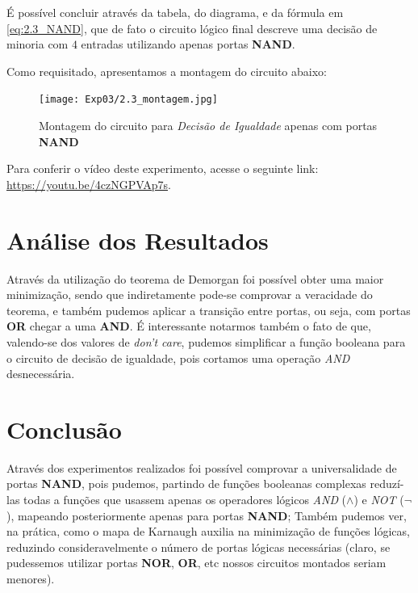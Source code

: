 \documentclass[12pt]{article}
\begin{document}
É possível concluir através da tabela, do diagrama, e da fórmula em
\ref{eq:2.3_NAND}, que de fato o circuito lógico final descreve uma decisão de
minoria com \(4\) entradas utilizando apenas portas \textbf{NAND}.

Como requisitado, apresentamos a montagem do circuito abaixo:

\begin{figure}[H]
    \centering
    \texttt{[image: Exp03/2.3\_montagem.jpg]}
    \caption{Montagem do circuito para \textit{Decisão de Igualdade} apenas com portas \textbf{NAND}}
    \label{fig:decisao_igualdade_montagem}
\end{figure}

Para conferir o vídeo deste experimento, acesse o seguinte link:
\href{https://youtu.be/4czNGPVAp7s}{https://youtu.be/4czNGPVAp7s}.
\\[2em]

\section{Análise dos Resultados}
\label{sec:Resultados}

Através da utilização do teorema de Demorgan foi possível obter uma maior
minimização, sendo que indiretamente pode-se comprovar a veracidade do teorema,
e também pudemos aplicar a transição entre portas, ou seja, com portas
\textbf{OR} chegar a uma \textbf{AND}. É interessante notarmos também o fato de
que, valendo-se dos valores de \emph{don't care}, pudemos simplificar a função
booleana para o circuito de decisão de igualdade, pois cortamos uma operação
\emph{AND} desnecessária.

\section{Conclusão}
\label{sec:Conclusao}

Através dos experimentos realizados foi possível comprovar a universalidade de
portas \textbf{NAND}, pois pudemos, partindo de funções booleanas complexas
reduzí-las todas a funções que usassem apenas os operadores lógicos \emph{AND}
(\(\land\)) e \emph{NOT} (\(\lnot\)), mapeando posteriormente apenas para portas
\textbf{NAND}; Também pudemos ver, na prática, como o mapa de Karnaugh auxilia
na minimização de funções lógicas, reduzindo consideravelmente o número de
portas lógicas necessárias (claro, se pudessemos utilizar portas \textbf{NOR},
\textbf{OR}, etc nossos circuitos montados seriam menores).
\end{document}
